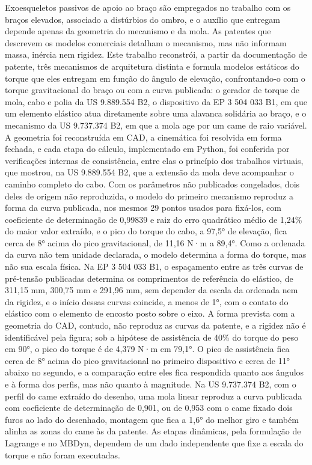 \begin{resumo}
Exoesqueletos passivos de apoio ao braço são empregados no trabalho com os braços elevados, associado a distúrbios do ombro, e o auxílio que entregam depende apenas da geometria do mecanismo e da mola. As patentes que descrevem os modelos comerciais detalham o mecanismo, mas não informam massa, inércia nem rigidez. Este trabalho reconstrói, a partir da documentação de patente, três mecanismos de arquitetura distinta e formula modelos estáticos do torque que eles entregam em função do ângulo de elevação, confrontando-o com o torque gravitacional do braço ou com a curva publicada: o gerador de torque de mola, cabo e polia da US 9.889.554 B2, o dispositivo da EP 3 504 033 B1, em que um elemento elástico atua diretamente sobre uma alavanca solidária ao braço, e o mecanismo da US 9.737.374 B2, em que a mola age por um came de raio variável. A geometria foi reconstruída em CAD, a cinemática foi resolvida em forma fechada, e cada etapa do cálculo, implementado em Python, foi conferida por verificações internas de consistência, entre elas o princípio dos trabalhos virtuais, que mostrou, na US 9.889.554 B2, que a extensão da mola deve acompanhar o caminho completo do cabo. Com os parâmetros não publicados congelados, dois deles de origem não reproduzida, o modelo do primeiro mecanismo reproduz a forma da curva publicada, nos mesmos 29 pontos usados para fixá-los, com coeficiente de determinação de 0,99839 e raiz do erro quadrático médio de 1,24\% do maior valor extraído, e o pico do torque do cabo, a 97,5° de elevação, fica cerca de 8° acima do pico gravitacional, de 11,16 N·m a 89,4°. Como a ordenada da curva não tem unidade declarada, o modelo determina a forma do torque, mas não sua escala física. Na EP 3 504 033 B1, o espaçamento entre as três curvas de pré-tensão publicadas determina os comprimentos de referência do elástico, de 311,15 mm, 300,75 mm e 291,96 mm, sem depender da escala da ordenada nem da rigidez, e o início dessas curvas coincide, a menos de 1°, com o contato do elástico com o elemento de encosto posto sobre o eixo. A forma prevista com a geometria do CAD, contudo, não reproduz as curvas da patente, e a rigidez não é identificável pela figura; sob a hipótese de assistência de 40\% do torque do peso em 90°, o pico do torque é de 4,379 N·m em 79,1°. O pico de assistência fica cerca de 8° acima do pico gravitacional no primeiro dispositivo e cerca de 11° abaixo no segundo, e a comparação entre eles fica respondida quanto aos ângulos e à forma dos perfis, mas não quanto à magnitude. Na US 9.737.374 B2, com o perfil do came extraído do desenho, uma mola linear reproduz a curva publicada com coeficiente de determinação de 0,901, ou de 0,953 com o came fixado dois furos ao lado do desenhado, montagem que fica a 1,6° do melhor giro e também alinha as zonas do came às da patente. As etapas dinâmicas, pela formulação de Lagrange e no MBDyn, dependem de um dado independente que fixe a escala do torque e não foram executadas.


\end{resumo}
